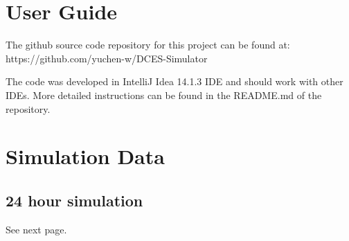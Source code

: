 \begin{appendices}
\chapter{User Guide}
\label{Guide}

The github source code repository for this project can be found at: https://github.com/yuchen-w/DCES-Simulator

The code was developed in IntelliJ Idea 14.1.3 IDE and should work with other IDEs. More detailed instructions can be found in the README.md of the repository.

\chapter{Simulation Data}
\section{24 hour simulation}
See next page.

\end{appendices}